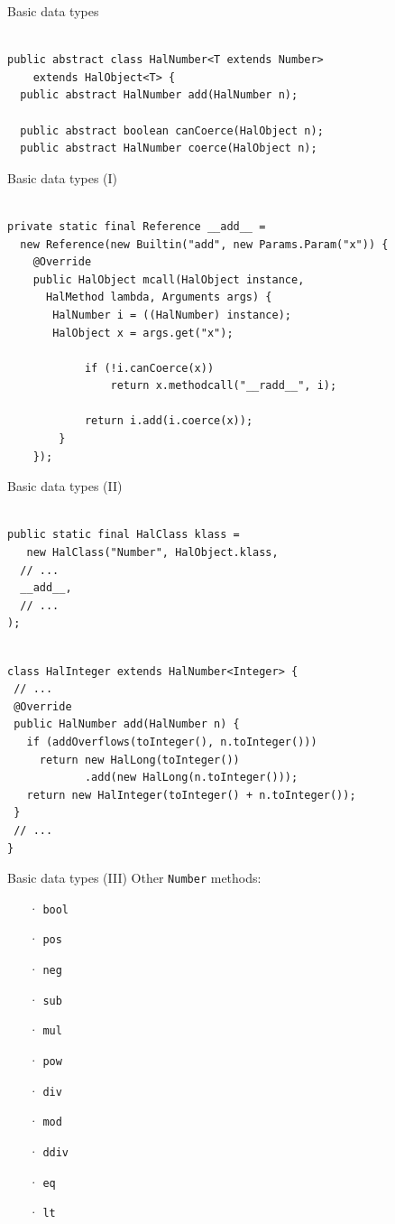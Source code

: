 \documentclass{beamer}
\begin{document}
\begin{frame}[fragile,breaklines=true]{Basic data types}
\begin{lstlisting}[style=java]

public abstract class HalNumber<T extends Number>
    extends HalObject<T> {
  public abstract HalNumber add(HalNumber n);

  public abstract boolean canCoerce(HalObject n);
  public abstract HalNumber coerce(HalObject n);\end{lstlisting}
\end{frame}
\begin{frame}[fragile]{Basic data types (I)}
\begin{lstlisting}[style=java]

private static final Reference __add__ =
  new Reference(new Builtin("add", new Params.Param("x")) {
    @Override
    public HalObject mcall(HalObject instance,
      HalMethod lambda, Arguments args) {
       HalNumber i = ((HalNumber) instance);
       HalObject x = args.get("x");

            if (!i.canCoerce(x))
                return x.methodcall("__radd__", i);

            return i.add(i.coerce(x));
        }
    });\end{lstlisting}
\end{frame}
\begin{frame}[fragile]{Basic data types (II)}
\begin{lstlisting}[style=java]

public static final HalClass klass =
   new HalClass("Number", HalObject.klass,
  // ...
  __add__,
  // ...
);\end{lstlisting}
\begin{lstlisting}[style=java]

class HalInteger extends HalNumber<Integer> {
 // ...
 @Override
 public HalNumber add(HalNumber n) {
   if (addOverflows(toInteger(), n.toInteger()))
     return new HalLong(toInteger())
            .add(new HalLong(n.toInteger()));
   return new HalInteger(toInteger() + n.toInteger());
 }
 // ...
}\end{lstlisting}
\end{frame}
\begin{frame}{Basic data types (III)}
Other \texttt{Number} methods:
\begin{itemize}
\item[·]
\texttt{bool}
\item[·]
\texttt{pos}
\item[·]
\texttt{neg}
\item[·]
\texttt{sub}
\item[·]
\texttt{mul}
\item[·]
\texttt{pow}
\item[·]
\texttt{div}
\item[·]
\texttt{mod}
\item[·]
\texttt{ddiv}
\item[·]
\texttt{eq}
\item[·]
\texttt{lt}
\end{itemize}
\end{frame}
\end{document}
